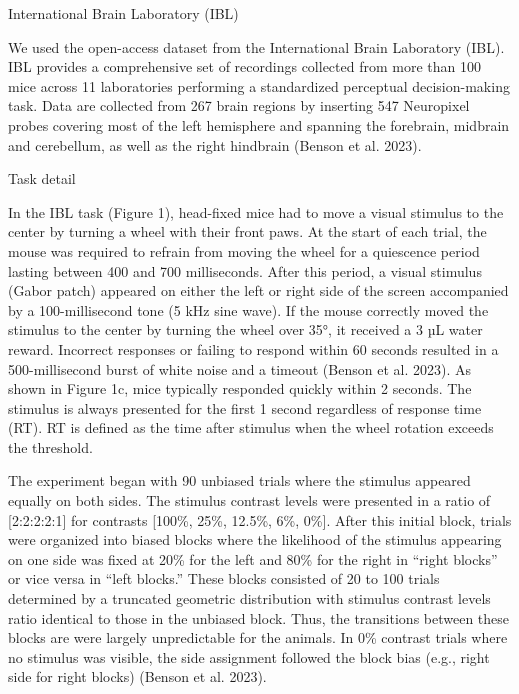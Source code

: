 \documentclass[
  letterpaper,
  DIV=11,
  numbers=noendperiod]{scrartcl}
\begin{document}
International Brain Laboratory (IBL)

We used the open-access dataset from the International Brain Laboratory
(IBL). IBL provides a comprehensive set of recordings collected from
more than 100 mice across 11 laboratories performing a standardized
perceptual decision-making task. Data are collected from 267 brain
regions by inserting 547 Neuropixel probes covering most of the left
hemisphere and spanning the forebrain, midbrain and cerebellum, as well
as the right hindbrain (Benson et al. 2023).

Task detail

In the IBL task (Figure 1), head-fixed mice had to move a visual
stimulus to the center by turning a wheel with their front paws. At the
start of each trial, the mouse was required to refrain from moving the
wheel for a quiescence period lasting between 400 and 700 milliseconds.
After this period, a visual stimulus (Gabor patch) appeared on either
the left or right side of the screen accompanied by a 100-millisecond
tone (5 kHz sine wave). If the mouse correctly moved the stimulus to the
center by turning the wheel over 35°, it received a 3 µL water reward.
Incorrect responses or failing to respond within 60 seconds resulted in
a 500-millisecond burst of white noise and a timeout (Benson et al.
2023). As shown in Figure 1c, mice typically responded quickly within 2
seconds. The stimulus is always presented for the first 1 second
regardless of response time (RT). RT is defined as the time after
stimulus when the wheel rotation exceeds the threshold.

The experiment began with 90 unbiased trials where the stimulus appeared
equally on both sides. The stimulus contrast levels were presented in a
ratio of {[}2:2:2:2:1{]} for contrasts {[}100\%, 25\%, 12.5\%, 6\%,
0\%{]}. After this initial block, trials were organized into biased
blocks where the likelihood of the stimulus appearing on one side was
fixed at 20\% for the left and 80\% for the right in ``right blocks'' or
vice versa in ``left blocks.'' These blocks consisted of 20 to 100
trials determined by a truncated geometric distribution with stimulus
contrast levels ratio identical to those in the unbiased block. Thus,
the transitions between these blocks are were largely unpredictable for
the animals. In 0\% contrast trials where no stimulus was visible, the
side assignment followed the block bias (e.g., right side for right
blocks) (Benson et al. 2023).
\end{document}
